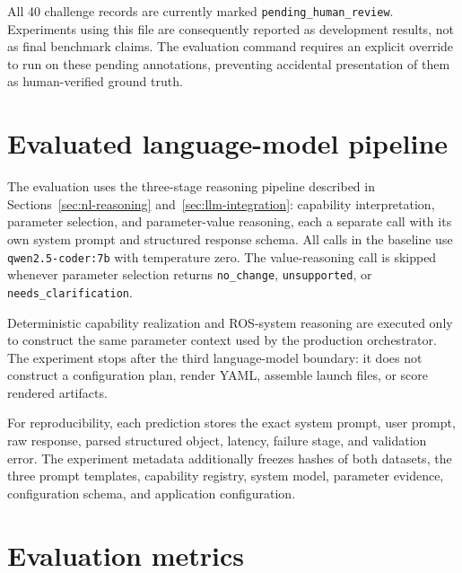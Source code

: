 All 40 challenge records are currently marked \texttt{pending\_human\_review}. Experiments using this file are consequently reported as development results, not as final benchmark claims. The evaluation command requires an explicit override to run on these pending annotations, preventing accidental presentation of them as human-verified ground truth.

\section{Evaluated language-model pipeline}

The evaluation uses the three-stage reasoning pipeline described in Sections~\ref{sec:nl-reasoning} and~\ref{sec:llm-integration}: capability interpretation, parameter selection, and parameter-value reasoning, each a separate call with its own system prompt and structured response schema. All calls in the baseline use \texttt{qwen2.5-coder:7b} with temperature zero. The value-reasoning call is skipped whenever parameter selection returns \texttt{no\_change}, \texttt{unsupported}, or \texttt{needs\_clarification}.

Deterministic capability realization and ROS-system reasoning are executed only to construct the same parameter context used by the production orchestrator. The experiment stops after the third language-model boundary: it does not construct a configuration plan, render YAML, assemble launch files, or score rendered artifacts.

For reproducibility, each prediction stores the exact system prompt, user prompt, raw response, parsed structured object, latency, failure stage, and validation error. The experiment metadata additionally freezes hashes of both datasets, the three prompt templates, capability registry, system model, parameter evidence, configuration schema, and application configuration.

\section{Evaluation metrics}

